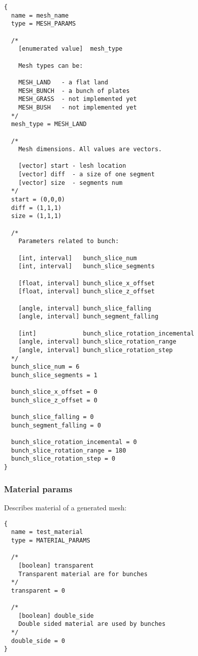 \documentclass[11pt]{article}
\begin{document}
\begin{verbatim}
{
  name = mesh_name
  type = MESH_PARAMS

  /*
    [enumerated value]  mesh_type
  
    Mesh types can be:
   
    MESH_LAND   - a flat land
    MESH_BUNCH  - a bunch of plates
    MESH_GRASS  - not implemented yet
    MESH_BUSH   - not implemented yet
  */
  mesh_type = MESH_LAND
  
  /*
    Mesh dimensions. All values are vectors.
  
    [vector] start - lesh location 
    [vector] diff  - a size of one segment 
    [vector] size  - segments num
  */  
  start = (0,0,0)
  diff = (1,1,1)
  size = (1,1,1)
  
  /*
    Parameters related to bunch:
    
    [int, interval]   bunch_slice_num
    [int, interval]   bunch_slice_segments
      
    [float, interval] bunch_slice_x_offset
    [float, interval] bunch_slice_z_offset
      
    [angle, interval] bunch_slice_falling
    [angle, interval] bunch_segment_falling
        
    [int]             bunch_slice_rotation_incemental
    [angle, interval] bunch_slice_rotation_range
    [angle, interval] bunch_slice_rotation_step
  */    
  bunch_slice_num = 6
  bunch_slice_segments = 1
  
  bunch_slice_x_offset = 0
  bunch_slice_z_offset = 0
  
  bunch_slice_falling = 0
  bunch_segment_falling = 0
  
  bunch_slice_rotation_incemental = 0
  bunch_slice_rotation_range = 180
  bunch_slice_rotation_step = 0
}
\end{verbatim}

\subsubsection{Material params}

Describes material of a generated mesh:

\begin{verbatim}
{
  name = test_material
  type = MATERIAL_PARAMS
  
  /*
    [boolean] transparent
    Transparent material are for bunches
  */
  transparent = 0
  
  /*
    [boolean] double_side
    Double sided material are used by bunches
  */
  double_side = 0  
}
\end{verbatim}
\end{document}
